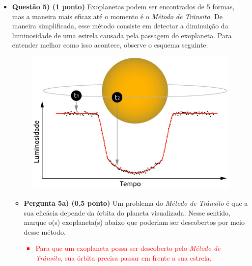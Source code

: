 \documentclass[a4paper, 12pt]{article}
\newcommand{\red}[1]{\textcolor{red}{#1}}
\begin{document}
\begin{flushleft}
\begin{itemize}
		\item \textbf{Questão 5) (1 ponto)} Exoplanetas podem ser encontrados de 5 formas, mas a maneira mais eficaz até o momento é o \textit{Método de Trânsito}. De maneira simplificada, esse método consiste em detectar a diminuição da luminosidade de uma estrela causada pela passagem do exoplaneta. Para entender melhor como isso acontece, observe o esquema seguinte:
			\begin{figure}[H]
				\centering
				\includegraphics[scale=0.7]{./img/5a.png}
			\end{figure}
			\begin{itemize}
				\item \textbf{Pergunta 5a) (0,5 ponto)} Um problema do \textit{Método de Trânsito} é que a sua eficácia depende da órbita do planeta visualizada. Nesse sentido, marque o(s) exoplaneta(s) abaixo que poderiam ser descobertos por meio desse método.
					\red{\begin{itemize}
						\item Para que um exoplaneta possa ser descoberto pelo \textit{Método de Trânsito}, sua órbita precisa passar em frente a sua estrela.
					\end{itemize}}
					\begin{multicols}{3}
						\begin{figure}[H]
							\centering

\end{figure}
\end{multicols}
\end{itemize}
\end{itemize}
\end{flushleft}
\end{document}
